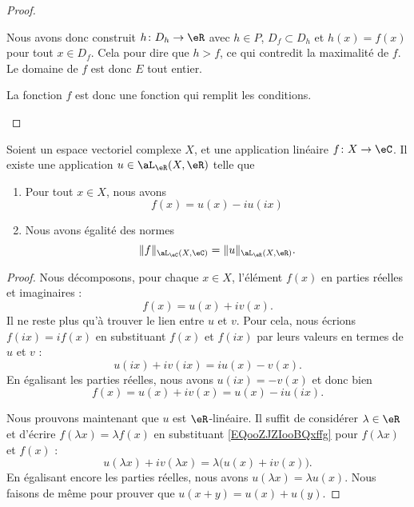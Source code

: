 \begin{proof}
\begin{subproof}
		Nous avons donc construit \( h\colon D_h\to \eR\) avec \( h\in P\), \( D_f\subset D_h\) et \( h(x)=f(x)\) pour tout \( x\in D_f\). Cela pour dire que \( h>f\), ce qui contredit la maximalité de \( f\). Le domaine de \( f\) est donc \( E\) tout entier.

		La fonction \( f\) est donc une fonction qui remplit les conditions.

	\end{subproof}
\end{proof}


\begin{lemma}
	Soient un espace vectoriel complexe \( X\), et une application linéaire \(f \colon X\to \eC  \). Il existe une application \( u\in \aL_\eR(X,\eR)\) telle que
	\begin{enumerate}
		\item
		      Pour tout \( x\in X\), nous avons
		      \begin{equation}
			      f(x)=u(x)-iu(ix)
		      \end{equation}
		\item
		      Nous avons égalité des normes		%
		      \begin{equation}
			      \| f \|_{\aL_\eC(X,\eC)}=\| u \|_{\aL_\eR(X,\eR)}.
		      \end{equation}
	\end{enumerate}
\end{lemma}

\begin{proof}
	Nous décomposons, pour chaque \( x\in X\), l'élément \( f(x)\) en parties réelles et imaginaires :
	\begin{equation}		\label{EQooZJZIooBQxffg}
		f(x)=u(x)+iv(x).
	\end{equation}
	Il ne reste plus qu'à trouver le lien entre \( u\) et \( v\). Pour cela, nous écrions \( f(ix)=if(x)\) en substituant \( f(x)\) et \( f(ix)\) par leurs valeurs en termes de \( u\) et \( v\) :
	\begin{equation}
		u(ix)+iv(ix)=iu(x)-v(x).
	\end{equation}
	En égalisant les parties réelles, nous avons \( u(ix)=-v(x)\) et donc bien
	\begin{equation}	\label{EQooZUTLooVzwRDM}
		f(x)=u(x)+iv(x)=u(x)-iu(ix).
	\end{equation}

	Nous prouvons maintenant que \( u\) est \( \eR\)-linéaire. Il suffit de considérer \( \lambda\in\eR\) et d'écrire \( f(\lambda x)=\lambda f(x)\) en substituant \eqref{EQooZJZIooBQxffg} pour \( f(\lambda x)\) et \( f(x)\) :
	\begin{equation}
		u(\lambda x)+iv(\lambda x)=\lambda\big( u(x)+iv(x) \big).
	\end{equation}
	En égalisant encore les parties réelles, nous avons \( u(\lambda x)=\lambda u(x)\). Nous faisons de même pour prouver que \( u(x+y)=u(x)+u(y)\).
\end{proof}

